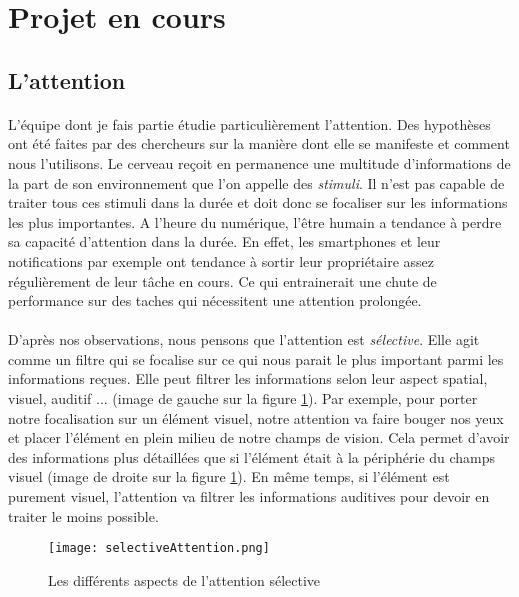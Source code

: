 
\section{Projet en cours}

\subsection{L'attention}

\paragraph{}L'équipe dont je fais partie étudie particulièrement l'attention. Des hypothèses ont été faites par des chercheurs sur la manière dont elle se manifeste et comment nous
l'utilisons. Le cerveau reçoit en permanence une multitude d'informations de la part de son environnement que l'on appelle des \emph{stimuli}. Il n'est pas capable de traiter tous ces
stimuli dans la durée et doit donc se focaliser sur les informations les plus importantes. A l'heure du numérique, l'être humain a tendance à perdre sa capacité d'attention dans la
durée. En effet, les smartphones et leur notifications par exemple ont tendance à sortir leur propriétaire assez régulièrement de leur tâche en cours. Ce qui entrainerait une chute de
performance sur des taches qui nécessitent une attention prolongée.

\paragraph{}D'après nos observations, nous pensons que l'attention est \emph{sélective}. Elle agit comme un filtre qui se focalise sur ce qui nous parait le plus important parmi les
informations reçues. Elle peut filtrer les informations selon leur aspect spatial, visuel, auditif ... (image de gauche sur la figure \ref{AspectSelectiveAttention}). Par exemple, pour
porter notre focalisation sur un élément visuel, notre attention va faire bouger nos yeux et placer l'élément en plein milieu de notre champs de vision. Cela permet d'avoir des
informations plus détaillées que si l'élément était à la périphérie du champs visuel (image de droite sur la figure \ref{AspectSelectiveAttention}). En même temps, si l'élément est
purement visuel, l'attention va filtrer les informations auditives pour devoir en traiter le moins possible.

\begin{figure}[h]
    \begin{center}
    \texttt{[image: selectiveAttention.png]}
    \end{center}
    \caption{Les différents aspects de l'attention sélective}
\label{AspectSelectiveAttention}
\end{figure}

